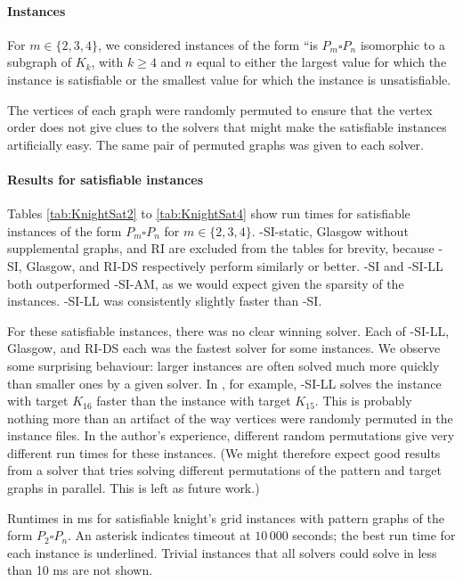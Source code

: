 \paragraph{Instances}

For $m \in \{2,3,4\}$, we considered instances of the form ``is $P_m \square P_n$ isomorphic
to a subgraph of $K_k$, with $k \geq 4$ and $n$ equal to either the largest value for which
the instance is satisfiable or the smallest value for which the instance is unsatisfiable.

The vertices of each graph were randomly permuted to ensure that the vertex
order does not give clues to the solvers that might make the satisfiable
instances artificially easy.  The same pair of permuted graphs was given to
each solver.

\paragraph{Results for satisfiable instances}
Tables \ref{tab:KnightSat2} to \ref{tab:KnightSat4} show run times for satisfiable instances
of the form $P_m \square P_n$ for $m \in \{2,3,4\}$.
\McSplit-SI-static, Glasgow without supplemental graphs, and RI are excluded from the tables for brevity,
because \McSplit-SI, Glasgow, and RI-DS respectively perform similarly or better.
\McSplit-SI and \McSplit-SI-LL both outperformed \McSplit-SI-AM, as we would expect given the
sparsity of the instances. \McSplit-SI-LL was consistently slightly faster than \McSplit-SI.

For these satisfiable instances, there was no clear winning solver. Each of
\McSplit-SI-LL, Glasgow, and RI-DS each was the fastest solver for some
instances.  We observe some surprising behaviour: larger instances are often
solved much more quickly than smaller ones by a given solver. In
, for example, \McSplit-SI-LL solves the instance with
target $K_{16}$ faster than the instance with target $K_{15}$.  This is
probably nothing more than an artifact of the way vertices were randomly
permuted in the instance files. In the author's experience, different random
permutations give very different run times for these instances.  (We might
therefore expect good results from a solver that tries solving different
permutations of the pattern and target graphs in parallel.  This is left as
future work.)

\begin{table}[htb]
\centering
\footnotesize
    
\caption{Runtimes in ms for satisfiable knight's grid instances with pattern graphs of
        the form $P_2 \square P_n$.  An asterisk indicates timeout at $10\,000$ seconds;
        the best run time for each instance is underlined.  Trivial instances that all solvers
        could solve in less than 10 ms are not shown.}
\label{tab:KnightSat2}
\end{table}

